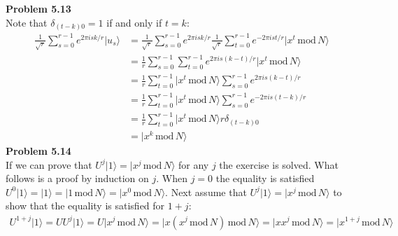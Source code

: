 \documentclass[fleqn]{article}
\newcommand{\problem}[1]{{\large\textbf{Problem #1}}}
\newcommand{\ket}[1]{\ensuremath{| #1 \rangle}}
\newcommand{\modF}[2]{\ensuremath{#1 \, \text{mod} \, #2}}
\begin{document}
\problem{5.13} \\
Note that $\delta_{(t - k)0} = 1$ if and only if $t = k$:
\begin{align*}
  \frac{1}{\sqrt{r}} \sum_{s = 0}^{r - 1} e^{2 \pi i s k / r}\ket{u_s}
  &= \frac{1}{\sqrt{r}} \sum_{s = 0}^{r - 1} e^{2 \pi i s k / r}
     \frac{1}{\sqrt{r}} \sum_{t = 0}^{r - 1} e^{-2 \pi i s t / r} \ket{\modF{x^t}{N}} \\
  &= \frac{1}{r} \sum_{s = 0}^{r - 1} \sum_{t = 0}^{r - 1} e^{2 \pi i s (k - t) / r}\ket{\modF{x^t}{N}} \\
  &= \frac{1}{r} \sum_{t = 0}^{r - 1} \ket{\modF{x^t}{N}} \sum_{s = 0}^{r - 1} e^{2 \pi i s (k - t) / r} \\
  &= \frac{1}{r} \sum_{t = 0}^{r - 1} \ket{\modF{x^t}{N}} \sum_{s = 0}^{r - 1} e^{-2 \pi i s (t - k) / r} \\
  &= \frac{1}{r} \sum_{t = 0}^{r - 1} \ket{\modF{x^t}{N}} r \delta_{(t - k)0}\\
  &= \ket{\modF{x^k}{N}}
\end{align*}
\problem{5.14} \\
If we can prove that $U^j\ket{1} = \ket{\modF{x^j}{N}}$ for any $j$ the exercise
is solved. What follows is a proof by induction on $j$. When $j = 0$ the
equality is satisfied $U^0\ket{1} = \ket{1} = \ket{\modF{1}{N}} =
\ket{\modF{x^0}{N}}$. Next assume that $U^j\ket{1} = \ket{\modF{x^j}{N}}$ to
show that the equality is satisfied for $1 + j$:
\begin{align*}
  U^{1 + j}\ket{1} = U U^j \ket{1} = U \ket{\modF{x^j}{N}} = \ket{\modF{x\left( \modF{x^j}{N} \right)}{N}}
  = \ket{\modF{x x^{j}}{N}}= \ket{\modF{x^{1 + j}}{N}}
\end{align*}
\end{document}
